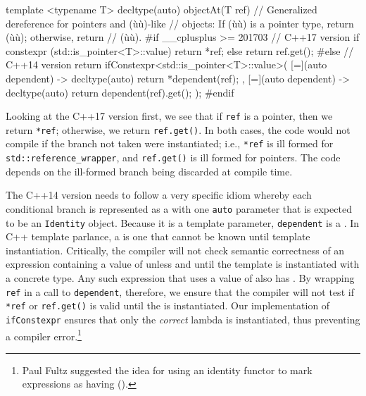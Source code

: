 {\begin{emcppslisting}
template <typename T>
decltype(auto) objectAt(T ref)
    // Generalized dereference for pointers and (ù{}ù)-like
    // objects: If (ù{}ù) is a pointer type, return (ù{}ù); otherwise, return
    // (ù{}ù).
{
#if __cplusplus >= 201703
    // C++17 version
    if constexpr (std::is_pointer<T>::value) { return *ref; }
    else                                     { return ref.get(); }
#else
    // C++14 version
    return ifConstexpr<std::is_pointer<T>::value>(
        [=](auto dependent) -> decltype(auto) { return *dependent(ref); },
        [=](auto dependent) -> decltype(auto) { return dependent(ref).get(); });
#endif
}
\end{emcppslisting}
    

\noindent Looking at the C++17 version first, we see that if \lstinline!ref! is a
pointer, then we return \lstinline!*ref!; otherwise, we return
\lstinline!ref.get()!. In both cases, the code would not compile if the
branch not taken were instantiated; i.e., \lstinline!*ref! is ill formed
for \lstinline!std::reference_wrapper!, and \lstinline!ref.get()! is ill
formed for pointers. The code depends on the ill-formed branch being
discarded at compile time.

The C++14 version needs to follow a very specific idiom whereby
each conditional branch is represented as a  with
one \lstinline!auto! parameter that is expected to be an \lstinline!Identity!
object. Because it is a template parameter, \lstinline!dependent! is a
. In C++ template parlance, a  is one that cannot be known until template instantiation.
Critically, the compiler will not check semantic correctness of an
expression containing a value of  unless and
until the template is instantiated with a concrete type. Any such
expression that uses a value of  also has
. By wrapping \lstinline!ref! in a call to
\lstinline!dependent!, therefore, we ensure that the compiler will not test
if \lstinline!*ref! or \lstinline!ref.get()! is valid until the
 is instantiated. Our implementation of
\lstinline!ifConstexpr! ensures that only the \emph{correct} lambda is
instantiated, thus preventing a compiler error.{\cprotect\footnote{Paul
Fultz suggested the idea for using an identity functor to mark
  expressions as having  (\cite{fultz14}).}}

}
